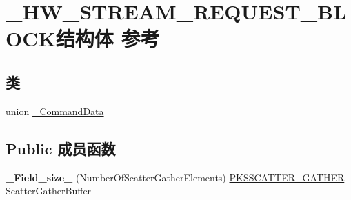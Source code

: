 \hypertarget{struct___h_w___s_t_r_e_a_m___r_e_q_u_e_s_t___b_l_o_c_k}{}\section{\+\_\+\+H\+W\+\_\+\+S\+T\+R\+E\+A\+M\+\_\+\+R\+E\+Q\+U\+E\+S\+T\+\_\+\+B\+L\+O\+C\+K结构体 参考}
\label{struct___h_w___s_t_r_e_a_m___r_e_q_u_e_s_t___b_l_o_c_k}
\subsection*{类}
\begin{DoxyCompactItemize}
\item 
union \hyperlink{union___h_w___s_t_r_e_a_m___r_e_q_u_e_s_t___b_l_o_c_k_1_1___command_data}{\+\_\+\+Command\+Data}
\end{DoxyCompactItemize}
\subsection*{Public 成员函数}
\begin{DoxyCompactItemize}
\item 
\mbox{\label{struct___h_w___s_t_r_e_a_m___r_e_q_u_e_s_t___b_l_o_c_k_ae6b983f4b7e4d3f86773b21d9bfbcb2f}} 
{\bfseries \+\_\+\+Field\+\_\+size\+\_\+} (Number\+Of\+Scatter\+Gather\+Elements) \hyperlink{struct_k_s_s_c_a_t_t_e_r___g_a_t_h_e_r}{P\+K\+S\+S\+C\+A\+T\+T\+E\+R\+\_\+\+G\+A\+T\+H\+ER} Scatter\+Gather\+Buffer
\end{DoxyCompactItemize}
